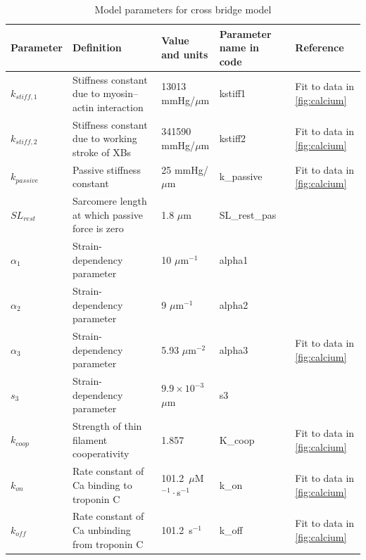 \documentclass[fleqn,10pt]{physiome}
\begin{document}
\begin{table}[!htb]
\centering
\small
\caption{Model parameters for cross bridge model }\label{tab:7}

\begin{supertabular}{p{1.4cm} p{4.4cm} p{1.8cm} p{2.0cm} p{2.0cm}}
\toprule
Parameter & Definition & Value and units & Parameter name in code & Reference \\
\midrule

$k_{stiff,1}$ & 
Stiffness constant due to myosin–actin interaction & 
13013 mmHg/$\mu$m & kstiff1 & 
Fit to data in \autoref{fig:calcium} \\

$k_{stiff,2}$ & 
Stiffness constant due to working stroke of XBs & 
341590 mmHg/$\mu$m  & kstiff2 &
Fit to data in \autoref{fig:calcium}  \\

$k_{passive}$ & Passive stiffness constant &
25 mmHg/$\mu$m & k\_passive &
Fit to data in \autoref{fig:calcium}  \\

$SL_{rest}$ & 
Sarcomere length at which passive force is zero  & 
1.8 $\mu$m & 
SL\_rest\_pas &
\cite{Campbell2018} \\

$\alpha_1$ & 
Strain-dependency parameter & 
10 $\mu$m$^{-1}$ & 
alpha1 &
\cite{Tewari2016b} \\

$\alpha_2$ & 
Strain-dependency parameter & 
9 $\mu$m$^{-1}$ & 
alpha2 &
\cite{Tewari2016b} \\

$\alpha_3$ & 
Strain-dependency parameter & 
5.93 $\mu$m$^{-2}$ & 
alpha3 &
Fit to data in \autoref{fig:calcium}  \\

$s_3$ & 
Strain-dependency parameter & 
$9.9 \times 10^{-3}$ $\mu$m &
s3 &
\cite{Tewari2016b} \\

$k_{coop}$ & 
Strength of thin filament cooperativity  & 
1.857 & 
K\_coop &
Fit to data in \autoref{fig:calcium}  \\

$k_{on}$ & 
Rate constant of Ca binding to troponin C & 
101.2~$\mu$M$^{-1}\cdot$s$^{-1}$ & 
k\_on &
Fit to data in \autoref{fig:calcium}  \\

$k_{off}$ & 
 Rate constant of Ca unbinding from troponin C  & 
101.2~s$^{-1}$ & 
k\_off &
Fit to data in \autoref{fig:calcium}  \\


\end{supertabular}
\end{table}
\end{document}
